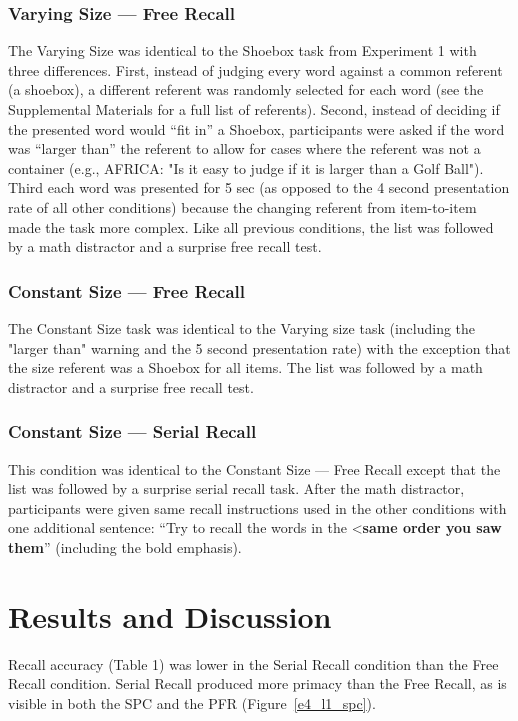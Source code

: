 \documentclass[man,natbib,floatsintext]{apa6} %
\begin{document}
\subsubsection{Varying Size --- Free Recall}
The Varying Size  was identical to the Shoebox task from Experiment 1 with three differences. First, instead of judging every word against a common referent (a shoebox), a different referent was randomly selected for each word (see the Supplemental Materials for a full list of referents). Second, instead of deciding if the presented word would ``fit in'' a Shoebox, participants were asked if the word was ``larger than'' the referent to allow for cases where the referent was not a container (e.g., AFRICA: "Is it easy to judge if it is larger than a Golf Ball"). Third each word was presented for 5 sec (as opposed to the 4 second presentation rate of all other conditions) because the changing referent from item-to-item made the task more complex. Like all previous conditions, the list was followed by a math distractor and a surprise free recall test.


\subsubsection{Constant Size --- Free Recall}
The Constant Size task was identical to the Varying size task (including the "larger than" warning and the 5 second presentation rate) with the exception that the size referent was a Shoebox for all items. The list was followed by a math distractor and a surprise free recall test.

\subsubsection{Constant Size --- Serial Recall} 
This condition was identical to the Constant Size --- Free Recall except that the list was followed by a surprise serial recall task. After the math distractor, participants were given same recall instructions used in the other conditions with one additional sentence: ``Try to recall the words in the <\textbf{same order you saw them}'' (including the bold emphasis).

\section{Results and Discussion}

Recall accuracy (Table 1) was lower in the Serial Recall condition than the Free Recall condition. Serial Recall produced more primacy than the Free Recall, as is visible in both the SPC and the PFR (Figure~\ref{e4_l1_spc}). 
\end{document}
